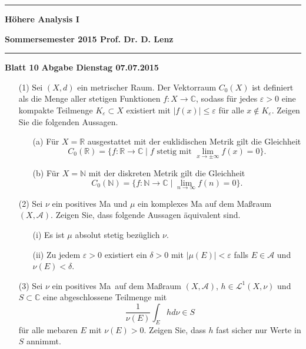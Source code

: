 \documentclass[12pt,a4paper]{article}
\newcommand{\IR}{{\mathbb{R}}}
\newcommand{\IN}{{\mathbb{N}}}
\newcommand{\IC}{{\mathbb{C}}}
\begin{document}
\rule{\textwidth}{0.3pt}
\begin{center}
\textbf{\large H\"ohere Analysis I}
\end{center}
\textbf{Sommersemester 2015 \hfill Prof. Dr. D. Lenz}

\rule{\textwidth}{0.3pt}

%
%
\textbf{Blatt 10}\hfill %
\textbf{Abgabe Dienstag 07.07.2015}

\begin{itemize}
\item[(1)]  Sei $(X,d)$ ein metrischer Raum. Der Vektorraum $C_0(X)$ ist definiert als die Menge aller stetigen Funktionen $f:X\to\IC$, sodass f\"ur jedes $\varepsilon>0$ eine kompakte Teilmenge $K_\varepsilon\subset X$ existiert mit $|f(x)|\leq\varepsilon$ f\"ur alle $x\not\in K_\varepsilon$. Zeigen Sie die folgenden Aussagen.
\begin{itemize}
\item[(a)] F\"ur $X=\IR$ ausgestattet mit der euklidischen Metrik gilt die Gleichheit 
$$C_0(\IR)=\{f:\IR\to\IC\;|\; f\text{ stetig mit } \lim\limits_{x\to\pm\infty} f(x)=0\}.$$
\item[(b)] F\"ur $X=\IN$ mit der diskreten Metrik gilt die Gleichheit 
$$C_0(\IN)=\{f:\IN\to\IC\;|\; \lim\limits_{n\to\infty} f(n)=0\}.$$
\end{itemize}

\item[(2)] Sei $\nu$ ein positives Ma\3 und
$\mu$ ein komplexes Ma\3 auf dem Ma\ss raum $(X,\mathcal{A})$. Zeigen Sie, dass folgende Aussagen \"aquivalent sind.

\begin{itemize}
\item[(i)] Es ist $\mu$ absolut stetig bez\"uglich $\nu$.
\item[(ii)] Zu jedem $\varepsilon >0$ existiert ein $\delta>0$ mit $|\mu (E)|< \varepsilon$ falls $E\in\mathcal{A}$ und $\nu (E) < \delta$.
\end{itemize}

\item[(3)] Sei $\nu$ ein positives Ma\3\, auf dem Ma\ss raum $(X,\mathcal{A})$, $h\in\mathcal{L}^1 (X,\nu)$ und $S\subset \mathbb{C}$ eine abgeschlossene Teilmenge mit
$$\frac{1}{\nu (E)} \int_E h d\nu \in S$$
f\"ur alle me\3baren $E$ mit $\nu (E) >0$. Zeigen Sie, dass $h$ fast sicher nur Werte in $S$ annimmt.


\end{itemize}
\end{document}
